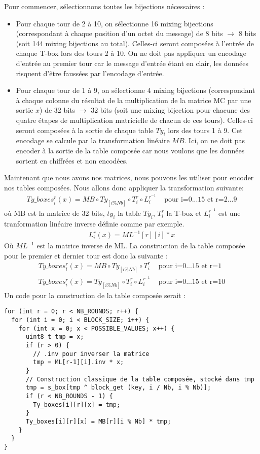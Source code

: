 \documentclass[a4paper, 10pt]{article}
\begin{document}
Pour commencer, sélectionnons toutes les bijections nécessaires :
\begin{itemize}
  \item Pour chaque tour de 2 à 10, on sélectionne 16 mixing bijections (correspondant à chaque position d'un octet du message) de 8 bits $\rightarrow$ 8 bits 
  (soit 144 mixing bijections au total). Celles-ci seront composées à l'entrée de chaque T-box lors des tours 2 à 10.
  On ne doit pas appliquer un encodage d'entrée 
  au premier tour car le message d'entrée étant en clair, les données risquent d'être faussées par l'encodage d'entrée.
  \item Pour chaque tour de 1 à 9, on sélectionne 4 mixing bijections (correspondant à chaque colonne du résultat de la multiplication de  
  la matrice MC par une sortie $x$) de 32 bits $\rightarrow$ 32 bits 
  (soit une mixing bijection pour chacune des quatre étapes de multiplication matricielle de chacun de ces tours). 
  Celles-ci seront composées à la sortie de chaque table $Ty_{i}$ lors des tours 1 à 9. Cet encodage se calcule par la 
  transformation linéaire $MB$. Ici, on ne doit pas encoder à la sortie de la table composée car nous voulons que les données sortent en 
  chiffrées et non encodées.
\end{itemize}
Maintenant que nous avons nos matrices, nous pouvons les utiliser pour encoder nos tables composées.
Nous allons donc appliquer la transformation suivante:
\begin{align*}
  Ty\_boxes_{i}^{r}(x) = MB \circ Ty_{[i \% Nb]} \circ T_{i}^{r} \circ L_{i}^{r^{-1}}  & \text{  pour i=0...15 et r=2...9} 
\end{align*}
où MB est la matrice de 32 bits, \(ty_{i}\) la table $Ty_{i}$, \(T_{i}^{r}\) la T-box et 
\(L_{i}^{r^{-1}}\) est une tranformation linéaire inverse définie comme par exemple.
\begin{align*}
  L_{i}^{r}(x) = ML^{-1}[r][i] * x
\end{align*}
Où \(ML^{-1}\) est la matrice inverse de ML.
La construction de la table composée pour le premier et dernier tour est donc la suivante :
\begin{align*}
  Ty\_boxes_{i}^{r}(x) = MB \circ Ty_{[i \% Nb]} \circ T_{i}^{r}  & \text{  pour i=0...15 et r=1} \\
  Ty\_boxes_{i}^{r}(x) = Ty_{[i \% Nb]} \circ T_{i}^{r} \circ L_{i}^{r^{-1}} & \text{  pour i=0...15 et r=10}
\end{align*}
Un code pour la construction de la table composée serait :
\small{
  \begin{verbatim}
for (int r = 0; r < NB_ROUNDS; r++) {
  for (int i = 0; i < BLOCK_SIZE; i++) {
    for (int x = 0; x < POSSIBLE_VALUES; x++) {
      uint8_t tmp = x;
      if (r > 0) {
        // .inv pour inverser la matrice
        tmp = ML[r-1][i].inv * x;
      }
      // Construction classique de la table composée, stocké dans tmp
      tmp = s_box[tmp ^ block_get (key, i / Nb, i % Nb)];
      if (r < NB_ROUNDS - 1) {
        Ty_boxes[i][r][x] = tmp;
      } 
      Ty_boxes[i][r][x] = MB[r][i % Nb] * tmp;
    }
  }
}
  \end{verbatim}
}
\end{document}
